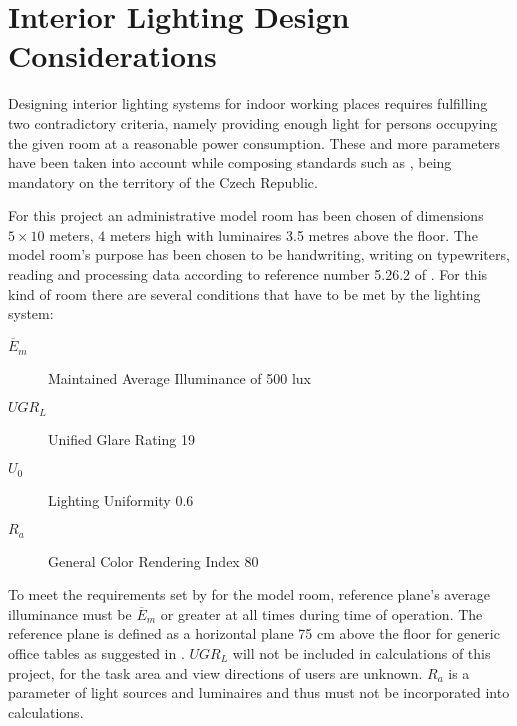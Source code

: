\section{Interior Lighting Design Considerations} \label{sec:design}
Designing interior lighting systems for indoor working places requires fulfilling two contradictory criteria, namely providing enough light for persons occupying the given room at a reasonable power consumption. These and more parameters have been taken into account while composing standards such as \cite{12464}, being mandatory on the territory of the Czech Republic.

For this project an administrative model room has been chosen of dimensions $5 \times 10 $ meters, $4$ meters high with luminaires 3.5 metres above the floor. The model room's purpose has been chosen to be handwriting, writing on typewriters, reading and processing data according to reference number 5.26.2 of \cite{12464}. For this kind of room there are several conditions that have to be met by the lighting system:

\begin{description}
	\item[$\overline{E}_{m}$] Maintained Average Illuminance of 500 lux
	\item[$UGR_{L}$] Unified Glare Rating 19
	\item[$U_{0}$] Lighting Uniformity 0.6
	\item[$R_{a}$] General Color Rendering Index 80
\end{description}

To meet the requirements set by \cite{12464} for the model room, reference plane's average illuminance must be $\overline{E}_{m}$ or greater at all times during time of operation. The reference plane is defined as a horizontal plane 75 cm above the floor for generic office tables as suggested in \cite{12464}. $UGR_{L}$ will not be included in calculations of this project, for the task area and view directions of users are unknown. $R_{a}$ is a parameter of light sources and luminaires and thus must not be incorporated into calculations.
